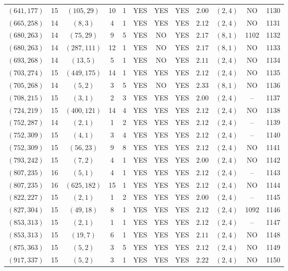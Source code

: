 \begin{longtable}{|c|c|c|c|c|c|c|c|c|c|c|c|}
$(641,177)$ & 15 & $(105,29)$ & 10 & 1 & YES & YES & YES & $2.00$ & $(2,4)$ & NO & 1130\\
$(665,258)$ & 14 & $(8,3)$ & 4 & 1 & YES & YES & YES & $2.12$ & $(2,4)$ & NO & 1131\\
$(680,263)$ & 14 & $(75,29)$ & 9 & 5 & YES & NO & YES & $2.17$ & $(8,1)$ & 1102 & 1132\\
$(680,263)$ & 14 & $(287,111)$ & 12 & 1 & YES & NO & YES & $2.17$ & $(8,1)$ & NO & 1133\\
$(693,268)$ & 14 & $(13,5)$ & 5 & 1 & YES & NO & YES & $2.11$ & $(2,4)$ & NO & 1134\\
$(703,274)$ & 15 & $(449,175)$ & 14 & 1 & YES & YES & YES & $2.12$ & $(2,4)$ & NO & 1135\\
$(705,268)$ & 14 & $(5,2)$ & 3 & 5 & YES & NO & YES & $2.33$ & $(8,1)$ & NO & 1136\\
$(708,215)$ & 15 & $(3,1)$ & 2 & 3 & YES & YES & YES & $2.00$ & $(2,4)$ & -- & 1137\\
$(724,219)$ & 15 & $(400,121)$ & 14 & 4 & YES & YES & YES & $2.12$ & $(2,4)$ & NO & 1138\\
$(752,287)$ & 14 & $(2,1)$ & 1 & 2 & YES & YES & YES & $2.12$ & $(2,4)$ & -- & 1139\\
$(752,309)$ & 15 & $(4,1)$ & 3 & 4 & YES & YES & YES & $2.12$ & $(2,4)$ & -- & 1140\\
$(752,309)$ & 15 & $(56,23)$ & 9 & 8 & YES & YES & YES & $2.12$ & $(2,4)$ & NO & 1141\\
$(793,242)$ & 15 & $(7,2)$ & 4 & 1 & YES & YES & YES & $2.00$ & $(2,4)$ & NO & 1142\\
$(807,235)$ & 16 & $(5,1)$ & 4 & 1 & YES & YES & YES & $2.12$ & $(2,4)$ & -- & 1143\\
$(807,235)$ & 16 & $(625,182)$ & 15 & 1 & YES & YES & YES & $2.12$ & $(2,4)$ & NO & 1144\\
$(822,227)$ & 15 & $(2,1)$ & 1 & 2 & YES & YES & YES & $2.00$ & $(2,4)$ & -- & 1145\\
$(827,304)$ & 15 & $(49,18)$ & 8 & 1 & YES & YES & YES & $2.12$ & $(2,4)$ & 1092 & 1146\\
$(853,313)$ & 15 & $(2,1)$ & 1 & 1 & YES & YES & YES & $2.12$ & $(2,4)$ & -- & 1147\\
$(853,313)$ & 15 & $(19,7)$ & 6 & 1 & YES & YES & YES & $2.11$ & $(2,4)$ & NO & 1148\\
$(875,363)$ & 15 & $(5,2)$ & 3 & 5 & YES & YES & YES & $2.12$ & $(2,4)$ & NO & 1149\\
$(917,337)$ & 15 & $(5,2)$ & 3 & 1 & YES & YES & YES & $2.22$ & $(2,4)$ & NO & 1150\\

\end{longtable}
